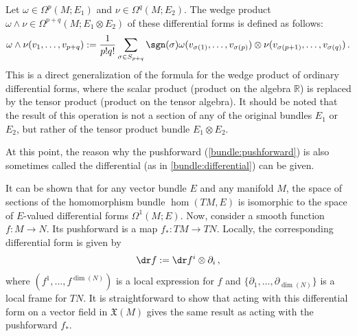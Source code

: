     \begin{construct}\label{bundle:vector_valued_wedge}
        Let $\omega\in\Omega^p(M;E_1)$ and $\nu\in\Omega^q(M;E_2)$. The wedge product $\omega\wedge\nu\in\Omega^{p+q}(M;E_1\otimes E_2)$ of these differential forms is defined as follows:
        \begin{gather}
            \omega\wedge\nu(v_1,\dots,v_{p+q}) := \frac{1}{p!q!}\sum_{\sigma\in S_{p+q}}\sgn(\sigma)\omega(v_{\sigma(1)},\ldots, v_{\sigma(p)})\otimes\nu(v_{\sigma(p+1)},\ldots,v_{\sigma(q)})\,.
        \end{gather}
        This is a direct generalization of the formula for the wedge product of ordinary differential forms, where the scalar product (product on the algebra $\mathbb{R}$) is replaced by the tensor product (product on the tensor algebra). It should be noted that the result of this operation is not a section of any of the original bundles $E_1$ or $E_2$, but rather of the tensor product bundle $E_1\otimes E_2$.
    \end{construct}

    At this point, the reason why the pushforward (\cref{bundle:pushforward}) is also sometimes called the differential (as in \cref{bundle:differential}) can be given.
    \begin{property}\label{bundle:differential_remark}
        It can be shown that for any vector bundle $E$ and any manifold $M$, the space of sections of the homomorphism bundle $\hom(TM,E)$ is isomorphic to the space of $E$-valued differential forms $\Omega^1(M;E)$. Now, consider a smooth function $f:M\rightarrow N$. Its pushforward is a map $f_*:TM\rightarrow TN$. Locally, the corresponding differential form is given by
        \begin{gather}
            \dr f := \dr f^i\otimes\partial_i\,,
        \end{gather}
        where $(f^1,\ldots,f^{\dim(N)})$ is a local expression for $f$ and $\{\partial_1,\ldots,\partial_{\dim(N)}\}$ is a local frame for $TN$. It is straightforward to show that acting with this differential form on a vector field in $\mathfrak{X}(M)$ gives the same result as acting with the pushforward $f_*$.
    \end{property}

